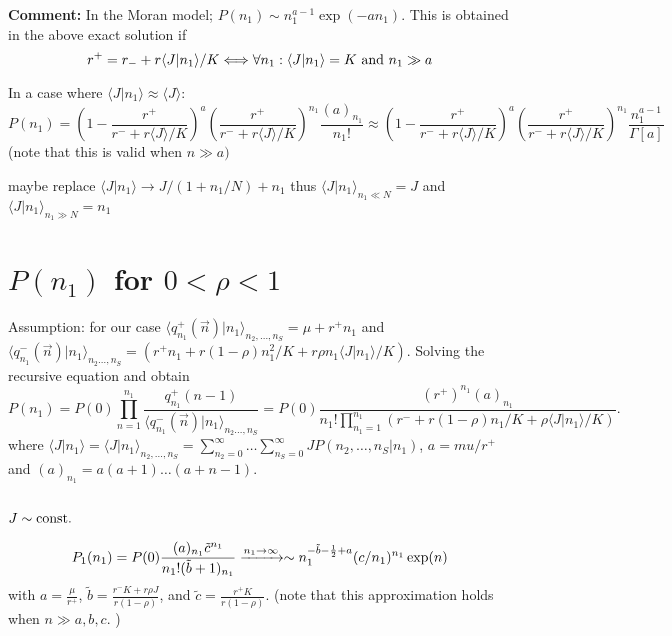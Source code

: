 \documentclass[%
 amsmath,amssymb,
 reprint,%
]{revtex4-2}
\begin{document}
\begin{widetext}
\vspace{0.5 cm}


{\bf Comment:} In the Moran model; $P(n_1)\sim n_1^{a-1}\exp(-an_1)$. 
This is obtained in the above exact solution if 
\begin{equation}
    r^+=r_-+r\langle J|n_1 \rangle /K \Longleftrightarrow \forall n_1:  \langle J |n_1 \rangle =K {\rm \ and\ } n_1 \gg a
\end{equation}




In a case where $\langle J|n_1\rangle \approx\langle J \rangle $:  \begin{equation}
    P(n_1)= \left(1-\frac{r^+}{r^-+r\langle J \rangle /K}\right)^{a}\left(\frac{r^+}{r^- + r \langle J \rangle /K}\right)^{n_1}\frac{ (a)_{n_1}}{n_1!} \approx  \left(1-\frac{r^+}{r^-+r\langle J \rangle /K}\right)^{a} \left(\frac{r^+}{r^- + r \langle J \rangle /K}\right)^{n_1}\frac{ n_1^{a-1}}{\Gamma[a]}
\end{equation}
(note that this is valid when $n \gg a)$

\vspace{0.5cm}

maybe replace 
$\langle J|n_1\rangle \rightarrow J /(1+n_1/N)+n_1 $ thus $\langle J|n_1\rangle_{n_1 \ll N}= J$ and  $\langle J|n_1\rangle_{n_1 \gg N}= n_1$ 

\section{$P(n_1)$ for $0<\rho<1$}

Assumption: for our case $\langle q_{n_1}^+(\vec{n})|n_1\rangle_{n_2,\dots,n_S}=\mu + r^+ n_1$ and $\langle q_{n_1}^-(\vec{n})|n_1\rangle_{n_2\dots,n_S}=\left(r^+ n_1+r(1-\rho)n_1^{2}/K+r\rho n_1\langle J |n_1 \rangle/K \right)$.
Solving the recursive equation and obtain
\begin{equation}
    P(n_1)=P(0)\prod_{n=1}^{n_1}\frac{q_{n_1}^{+}(n-1)}{\langle q_{n_1}^-(\vec{n})|n_1\rangle_{n_2\dots,n_S}}= P(0)\frac{(r^+)^{n_1}(a)_{n_1}}{n_1!\prod_{n_1=1}^{n_1}(r^-+r(1-\rho)n_1/K+\rho \langle J |n_1 \rangle /K)}.
\end{equation}
where
$\langle J |n_1 \rangle =\langle J |n_1 \rangle_{n_2,\dots,n_S}=\sum_{n_2=0}^{\infty}\dots \sum_{n_S=0}^{\infty} J P(n_2,\dots,n_S |n_1) $, $a=mu/r^+$ and $(a)_{n_1}=a(a+1)\dots (a+n-1)$.


\subsection{$J\sim {\rm const.}$}
\begin{equation}
    P_1(n_1)=P(0) 
    \frac{(a)_{n_1} \Tilde{c}^{n_1}}{n_1 ! (\Tilde{b}+1)_{n_1} } \xrightarrow{n_1 \rightarrow \infty} \sim  n_1 ^{-\tilde{b}-\frac{1}{2}+a}(c/n_1)^{n_1}\exp(n)
\end{equation}
with $a=\frac{\mu}{r^+}$, $\tilde{b}= \frac{r^-K+r\rho J}{r(1-\rho)}$, and $\tilde{c}=\frac{r^+ K}{r(1-\rho)}$. 
(note that this approximation holds when $n\gg a,b,c$. ) 


\end{widetext}
\end{document}
